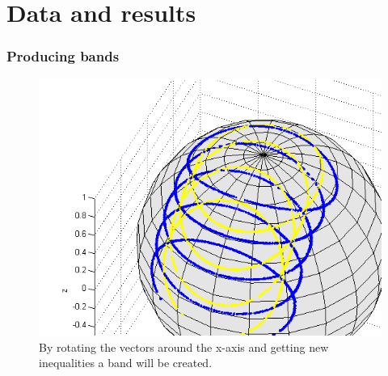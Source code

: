 \documentclass[•]{beamer}
\theoremstyle{remark}
\begin{document}
\section{Data and results}
\begin{frame}[shrink=10]\frametitle{Producing bands}
\begin{figure}[h!]
\begin{center}
\includegraphics[scale=0.4]{ine12all.png}
\caption{By rotating the vectors around the x-axis and getting new inequalities a band will be created.}
\end{center}
\end{figure}
\end{frame}
\end{document}
